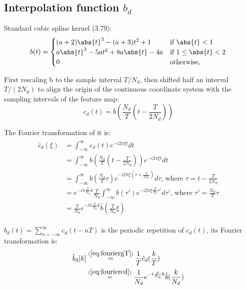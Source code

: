 \documentclass[12pt]{article}
\numberwithin{equation}{section}
\begin{document}
\subsection{Interpolation function $b_d$}
Standard cubic spline kernel \cite{szeliski2010computer} (3.79): 
\begin{equation}
	b(t)=
	\begin{cases}
		(a+2)\abs{t}^3-(a+3)t^2+1 & \text{if } \abs{t} < 1 \\
		a\abs{t}^3-5at^2+8a\abs{t}-4a & \text{if } 1 \leq \abs{t} < 2\\
		0	& \text{otherwise,}
    	\end{cases}
\end{equation} \par
First rescaling b to the sample interval $T/N_d$, then shifted half an interval $T/(2N_d)$ to align the origin of the continuous coordinate system with the sampling intervals of the feature map: 
\begin{equation}
	c_d(t)=b(\frac{N_d}{T}(t-\frac{T}{2N_d}))
\end{equation} \par
The Fourier transformation of it is:
\begin{align}\begin{split}\label{eq:fouriercd}
	\hat{c}_d(\xi) &= \int^{\infty}_{-\infty} c_d(t) e^{-i 2 \pi \xi t}dt \\
			&= \int^{\infty}_{-\infty} b(\frac{N_d}{T}(t-\frac{T}{2N_d})) e^{-i 2 \pi \xi t}dt \\
			&= \int^{\infty}_{-\infty} b(\frac{N_d}{T}\tau) e^{-i 2 \pi \xi (\tau + \frac{T}{2N_d} )} d\tau \text{, where } \tau = t-\frac{T}{2N_d}\\
			&= e^{-i\pi \frac{T}{N_d} k} \frac{T}{N_d} \int^{\infty}_{-\infty} b(\tau')e^{-i2\pi \xi \frac{T}{N_d} \tau' } d\tau' \text{, where } \tau' = \frac{N_d}{T}\tau\\
			&= \frac{T}{N_d} e^{-i\pi \frac{T}{N_d} k} \hat{b}(\frac{T}{N_d} \xi) 
\end{split}\end{align} \par
$b_d(t)=\sum^{\infty}_{n=-\infty}c_d(t-nT)$  is the periodic repetition of $c_d(t)$, its Fourier transformation is:
\begin{align}\begin{split}
	\hat{b}_d[k] 
	&\stackrel{(\ref{eq:fouriergT})}{=} \frac{1}{T} \hat{c}_d(\frac{k}{T}) \\
	&\stackrel{(\ref{eq:fouriercd})}{=}\frac{1}{N_d}e^{-i\frac{\pi}{N_d}k} \hat{b}(\frac{k}{N_d})
\end{split}\end{align} \par
\end{document}
